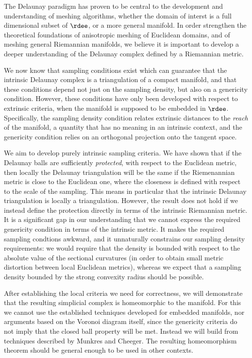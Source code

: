 %
%


%

The Delaunay paradigm has proven to be central to the development and
understanding of meshing algorithms, whether the domain of interst is
a full dimensional subset of $\rdee$, or a more general manifold. In
order strengthen the theoretical foundations of anisotropic meshing of
Euclidean domains, and of meshing general Riemannian manifolds, we
believe it is important to develop a deeper understanding of the
Delaunay complex defined by a Riemannian metric. 

We now know that sampling conditions exist which can guarantee that
the intrinsic Delaunay complex is a triangulation of a compact
manifold, and that these conditions depend not just on the sampling
density, but also on a genericity condition. However, these conditions
have only been developed with respect to extrinsic criteria, when the
manifold is supposed to be embedded in $\rdee$. Specifically, the
sampling density condition relates extrinsic distances to the
\emph{reach} of the manifold, a quantity that has no meaning in an
intrinsic context, and the genericity condition relies on an
orthogonal projection onto the tangent space. 

We aim to develop purely intrinsic sampling criteria. We have shown
that if the Delaunay balls are sufficiently \emph{protected}, with
respect to the Euclidean metric, then locally the Delaunay
triangulation will be the same if the Riemenannian metric is close to
the Euclidean one, where the closeness is defined with respect to the
scale of the sampling. This means in particular that the intrinsic
Delaunay triangulation is locally a triangulation. However, the result
does not hold if we instead define the protection directly in terms of
the intrinsic Riemannian metric. It is a significant gap in our
understanding that we cannot express the required genericity condition
in terms of the intrinsic metric. It makes the required sampling
condtions awkward, and it unnaturally constrains our sampling density
requirements: we would require that the density is bounded with
respect to the absolute value of the sectional curvatures (in order to
obtain small metric distortion between local Euclidean metrics),
whereas we expect that a sampling density bounded by the strong
convexity radius should be possible.

After establishing the local criteria we need for correctness, we will
demonstrate that the resulting simplicial complex is homeomorphic to
the manifold. For this we cannot use the established techniques
developed for embedded manifolds, nor arguments based on the Voronoi
diagram itself, since the genericity criteria do not imply that the
closed ball property will be met. Instead we will build from techniques
described by Munkres and Cheeger. The resulting homeomorphism theorem
should be general enough to be used in other contexts.

